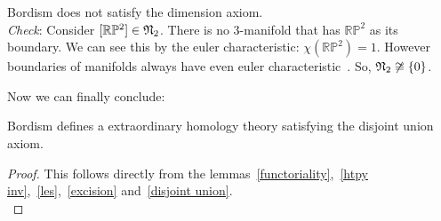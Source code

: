 \documentclass[a4paper,11pt]{article}
\begin{document}
\begin{observation}\label{dimension axiom}
    Bordism does not satisfy the dimension axiom.\\
    \textit{Check}: 
    Consider \([\mathbb{R}\mathbb{P}^2]\in \mathfrak{N}_2\). 
    There is no \(3\)-manifold that has \(\mathbb{RP}^2\) as its boundary. 
    We can see this by the euler characteristic: \(\chi(\mathbb{RP}^2)=1\). 
    However boundaries of manifolds always have even euler characteristic\ \cite[Proposition 18.6.2]{dieck}. 
    So, \(\mathfrak{N}_2\not\cong \{0\}\). 
\end{observation}


Now we can finally conclude:

\begin{theorem}
    Bordism defines a extraordinary homology theory satisfying the disjoint union axiom.
\end{theorem}

\begin{proof}
    This follows directly from the lemmas\ \ref{functoriality},\ \ref{htpy inv},\ \ref{les},\ \ref{excision} and\ \ref{disjoint union}.\\
\end{proof}


\end{document}
